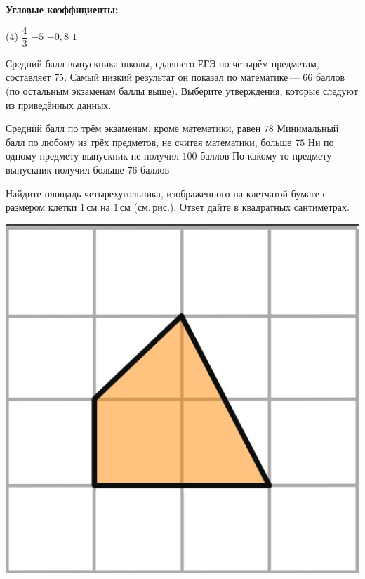 \begin{training}[1]
\begin{listofex}
\begin{minipage}[t]{\linewidth}
	\end{minipage}
	\\
	\\
	\textbf{Угловые коэффициенты:}
	\begin{tasks}(4)
		\task \( \dfrac{ 4 }{ 3 } \)
		\task \( -5 \)
		\task \( -0,8 \)
		\task \( 1 \)
	\end{tasks}
	\item Средний балл выпускника школы, сдавшего ЕГЭ по четырём предметам, составляет \(75\). Самый низкий результат он показал по математике --- \(66\) баллов (по остальным экзаменам баллы выше). Выберите утверждения, которые следуют из приведённых данных.
	\begin{tasks}
		\task Средний балл по трём экзаменам, кроме математики, равен \(78\)
		\task Минимальный балл по любому из трёх предметов, не считая математики, больше \(75\)
		\task Ни по одному предмету выпускник не получил \(100\) баллов
		\task По какому-то предмету выпускник получил больше \(76\) баллов
	\end{tasks}
	\item
	\begin{minipage}[t]{0.68\linewidth}
		Найдите площадь четырехугольника, изображенного на клетчатой бумаге с размером клетки \(1\) см на \(1\) см (см. рис.). Ответ дайте в квадратных сантиметрах.
	\end{minipage}
	\hspace{0.02\linewidth}
	\begin{minipage}[t]{0.27\linewidth}
		\includegraphics[align=t, width=\linewidth]{../pics/G101M8H3-9}

\end{minipage}
\end{listofex}
\end{training}
